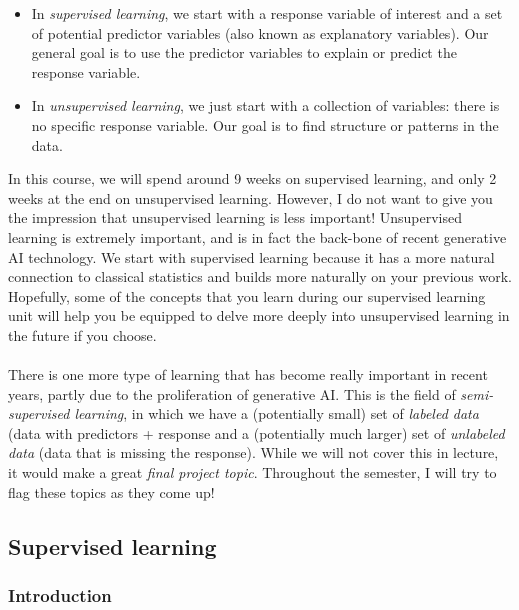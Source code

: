 \documentclass[titlepage,10pt]{scrartcl}
\begin{document}
\begin{itemize}
\item In \emph{supervised learning}, we start with a response variable of interest and a set of potential predictor variables (also known as explanatory variables). Our general goal is to use the predictor variables to explain or predict the response variable.
\item In \emph{unsupervised learning}, we just start with a collection of variables: there is no specific response variable. Our goal is to find structure or patterns in the data. 
\end{itemize}



In this course, we will spend around 9 weeks on supervised learning, and only 2 weeks at the end on unsupervised learning. However, I do not want to give you the impression that unsupervised learning is less important! Unsupervised learning is extremely important, and is in fact the back-bone of recent generative AI technology. We start with supervised learning because it has a more natural connection to classical statistics and builds more naturally on your previous work. Hopefully, some of the concepts that you learn during our supervised learning unit will help you be equipped to delve more deeply into unsupervised learning in the future if you choose.\\
\\
There is one more type of learning that has become really important in recent years, partly due to the proliferation of generative AI. This is the field of \emph{semi-supervised learning}, in which we have a (potentially small) set of \emph{labeled data} (data with predictors + response and a (potentially much larger) set of \emph{unlabeled data} (data that is missing the response). While we will not cover this in lecture, it would make a great \emph{final project topic}. Throughout the semester, I will try to flag these topics as they come up! 



\subsection{Supervised learning}

\subsubsection{Introduction}
\end{document}
